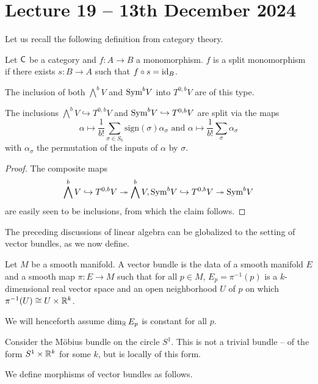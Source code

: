 \section{Lecture 19 -- 13th December 2024}\label{sec: lecture 19}
Let us recall the following definition from category theory. 
\begin{definition}\label{def: split surjection}
    Let $\mathsf{C}$ be a category and $f:A\to B$ a monomorphism. $f$ is a split monomorphism if there exists $s:B\to A$ such that $f\circ s=\mathrm{id}_{B}$. 
\end{definition}
The inclusion of both $\bigwedge^{b}V$ and $\mathrm{Sym}^{b}V$ into $T^{0,b}V$ are of this type. 
\begin{lemma}\label{lem: inclusion of symmetric and alternating tensors are split}
    The inclusions $\bigwedge^{b}V\hookrightarrow T^{0,b}V$ and $\mathrm{Sym}^{b}V\hookrightarrow T^{0,b}V$ are split via the maps 
    $$\alpha\mapsto\frac{1}{b!}\sum_{\sigma\in S_{b}}\mathrm{sign}(\sigma)\alpha_{\sigma}\text{ and }\alpha\mapsto\frac{1}{b!}\sum_{\sigma}\alpha_{\sigma}$$
    with $\alpha_{\sigma}$ the permutation of the inputs of $\alpha$ by $\sigma$. 
\end{lemma}
\begin{proof}
    The composite maps 
    $$\bigwedge^{b}V\hookrightarrow T^{0,b}V\twoheadrightarrow\bigwedge^{b}V, \mathrm{Sym}^{b}V\hookrightarrow T^{0,b}V\twoheadrightarrow\mathrm{Sym}^{b}V$$
    are easily seen to be inclusions, from which the claim follows. 
\end{proof}
The preceding discussions of linear algebra can be globalized to the setting of vector bundles, as we now define. 
\begin{definition}\label{def: vector bundle}
    Let $M$ be a smooth manifold. A vector bundle is the data of a smooth manifold $E$ and a smooth map $\pi:E\to M$ such that for all $p\in M$, $E_{p}=\pi^{-1}(p)$ is a $k$-dimensional real vector space and an open neighborhood $U$ of $p$ on which $\pi^{-1}(U)\cong U\times\mathbb{R}^{k}$. 
\end{definition}
\begin{remark}
    We will henceforth assume $\dim_{\mathbb{R}}E_{p}$ is constant for all $p$. 
\end{remark}
\begin{example}
    Consider the M\"{o}bius bundle on the circle $S^{1}$. This is not a trivial bundle -- of the form $S^{1}\times\mathbb{R}^{k}$ for some $k$, but is locally of this form. 
\end{example}
We define morphisms of vector bundles as follows. 
